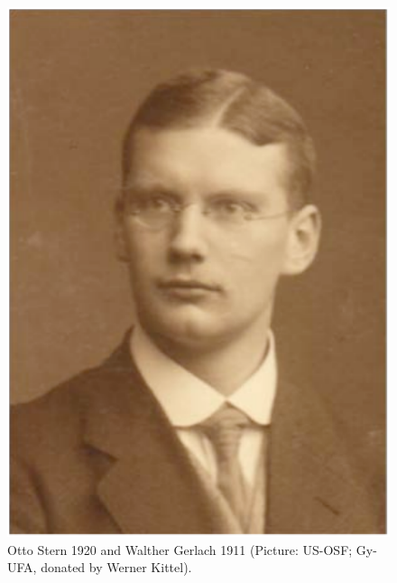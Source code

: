 \documentclass[12pt]{article}
\begin{document}
\begin{figure}
\begin{center}
\includegraphics[scale=0.505]{figures/Gerlach1911}
\caption{Otto Stern 1920 and Walther Gerlach 1911 (Picture: US-OSF; Gy-UFA, donated by Werner Kittel).}
\label{fig:SternGerlach}
\end{center}
\end{figure}
%
\end{document}
